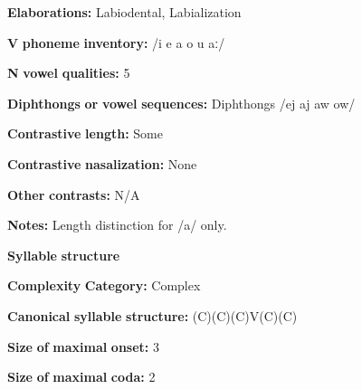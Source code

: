 \begin{styleBody}
\textbf{Elaborations:} Labiodental, Labialization
\end{styleBody}

\begin{styleBody}
\textbf{V} \textbf{phoneme} \textbf{inventory:} /i e a o u aː/
\end{styleBody}

\begin{styleBody}
\textbf{N} \textbf{vowel} \textbf{qualities:} 5
\end{styleBody}

\begin{styleBody}
\textbf{Diphthongs} \textbf{or} \textbf{vowel} \textbf{sequences:} Diphthongs /ej aj aw ow/
\end{styleBody}

\begin{styleBody}
\textbf{Contrastive} \textbf{length:} Some
\end{styleBody}

\begin{styleBody}
\textbf{Contrastive} \textbf{nasalization:} None
\end{styleBody}

\begin{styleBody}
\textbf{Other} \textbf{contrasts:} N/A
\end{styleBody}

\begin{styleBody}
\textbf{Notes:} Length distinction for /a/ only.
\end{styleBody}

\begin{styleBody}
\textbf{Syllable} \textbf{structure}
\end{styleBody}

\begin{styleBody}
\textbf{Complexity} \textbf{Category:} Complex
\end{styleBody}

\begin{styleBody}
\textbf{Canonical} \textbf{syllable} \textbf{structure:} (C)(C)(C)V(C)(C) \citep[41-8]{Lacrampe2014}
\end{styleBody}

\begin{styleBody}
\textbf{Size} \textbf{of} \textbf{maximal} \textbf{onset:} 3
\end{styleBody}

\begin{styleBody}
\textbf{Size} \textbf{of} \textbf{maximal} \textbf{coda:} 2
\end{styleBody}

